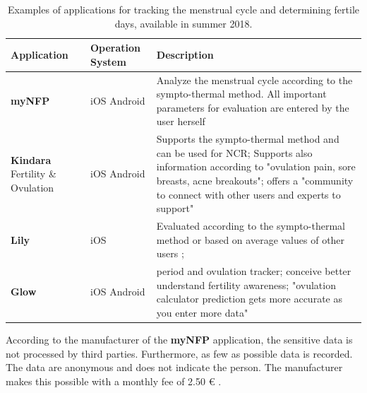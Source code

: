 \begin{table}[t]
  \caption{Examples of applications for tracking the menstrual cycle and determining fertile days, available in summer 2018.}
  \label{tab:typ_of_app_for_tracking_cycle}
  \scriptsize
  \begin{center}
    \begin{tabular}{|p{2cm}|p{3cm}|p{12cm}|}
		\hline
		Application & Operation System  & Description \\
		\hline
		\hline
		
		\textbf{myNFP} &  iOS \newline Android &  Analyze the menstrual cycle according to the sympto-thermal method. All important parameters for evaluation are entered by the user herself \cite{myNFP}
		\\
		\hline
		\textbf{Kindara} Fertility \& Ovulation  & iOS \newline Android & Supports the sympto-thermal method and can be used for \acs{NCR}; Supports also information according to "ovulation pain, sore breasts, acne breakouts"; offers a "community to connect with other users and experts to support" \cite{kindara}\\
		\hline
		\textbf{Lily} & iOS & Evaluated according to the sympto-thermal method or based on average values of other users \cite{lily};
		 \\
		\hline
		\textbf{Glow} & iOS \newline Android & period and ovulation tracker; conceive better understand fertility awareness; "ovulation calculator prediction gets more accurate as you enter more data" \cite{glow}\\
		\hline
	\end{tabular}
  \end{center}
\end{table}
According to the manufacturer of the \textbf{myNFP} application, the sensitive data is not processed by third parties. Furthermore, as few as possible data is recorded. The data are anonymous and does not indicate the person. The manufacturer makes this possible with a monthly fee of 2.50 \euro{} \cite{myNFP}.

